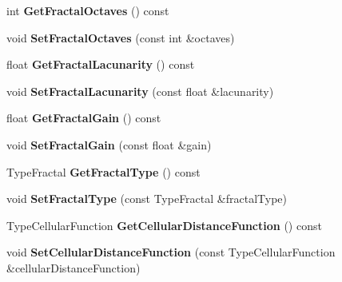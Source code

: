 \begin{DoxyCompactItemize}
int {\bfseries Get\+Fractal\+Octaves} () const
\item 
\mbox{\label{class_flounder_1_1_noise_fast_abe4e29343af726041549c87002b6793f}} 
void {\bfseries Set\+Fractal\+Octaves} (const int \&octaves)
\item 
\mbox{\label{class_flounder_1_1_noise_fast_a4afbf96ba71ac5c3c742a123ddd98f54}} 
float {\bfseries Get\+Fractal\+Lacunarity} () const
\item 
\mbox{\label{class_flounder_1_1_noise_fast_a93c47efd5330ce0d9a4708d48e2ef5aa}} 
void {\bfseries Set\+Fractal\+Lacunarity} (const float \&lacunarity)
\item 
\mbox{\label{class_flounder_1_1_noise_fast_a7503a0b43456991148ebf5249948f411}} 
float {\bfseries Get\+Fractal\+Gain} () const
\item 
\mbox{\label{class_flounder_1_1_noise_fast_ad56b350a5a3bb90ed77b5528f0fffde9}} 
void {\bfseries Set\+Fractal\+Gain} (const float \&gain)
\item 
\mbox{\label{class_flounder_1_1_noise_fast_a6efbe02c670a04432d97dd0c98f5e2e7}} 
Type\+Fractal {\bfseries Get\+Fractal\+Type} () const
\item 
\mbox{\label{class_flounder_1_1_noise_fast_a7ba82fc4861c5e6ed356810418914057}} 
void {\bfseries Set\+Fractal\+Type} (const Type\+Fractal \&fractal\+Type)
\item 
\mbox{\label{class_flounder_1_1_noise_fast_a9c08de14c3ef40d992fa5957432073ed}} 
Type\+Cellular\+Function {\bfseries Get\+Cellular\+Distance\+Function} () const
\item 
\mbox{\label{class_flounder_1_1_noise_fast_a8b5a2a7c9e4796ac219cd50fadeea500}} 
void {\bfseries Set\+Cellular\+Distance\+Function} (const Type\+Cellular\+Function \&cellular\+Distance\+Function)
\item 
\mbox{\label{class_flounder_1_1_noise_fast_ae4c44e212a23fb22a923f2a7616ebe4f}} 

\end{DoxyCompactItemize}
